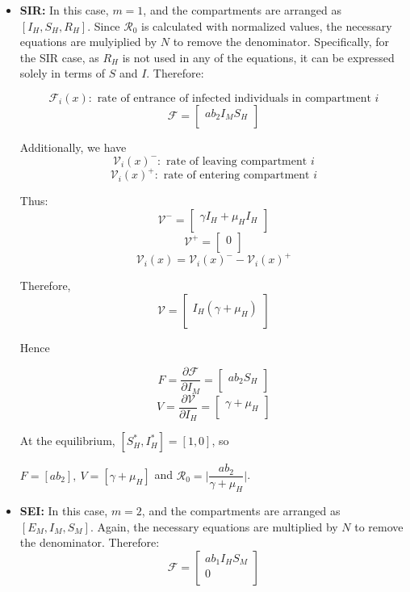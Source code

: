 \documentclass[a4paper,fleqn]{cas-dc}
\begin{document}
\begin{itemize}
\item \textbf{SIR:}
In this case, $m=1$, and the compartments are arranged as $[I_H, S_H, R_H]$. Since $\mathcal{R}_0$ is calculated with normalized values, the necessary equations are mulyiplied by $N$ to remove the denominator. Specifically, for the SIR case, as $R_H$ is not used in any of the equations, it can be expressed solely in terms of $S$ and $I$. Therefore:

$$ {\mathcal F}_i(x): \text{ rate of entrance of infected 
individuals in compartment } i $$
$$ {\mathcal F} =\begin{bmatrix}
a  b_2  I_M  S_H \\
\end{bmatrix} $$

Additionally, we have
$$ {\mathcal V}_i(x)^-: \text{ rate of leaving compartment } i $$
$$ {\mathcal V}_i(x)^+: \text{ rate of entering compartment } i $$

Thus:
$$
{\mathcal V^-} = \begin{bmatrix}
\gamma I_H + \mu_H I_H\\
\end{bmatrix}
$$
$$
{\mathcal V^+} = \begin{bmatrix}
0\\
\end{bmatrix}
$$
$${\mathcal V}_i (x) = {\mathcal V}_i(x)^{-} - {\mathcal V}_i(x)^+$$

Therefore,
$$
{\mathcal V} =
\begin{bmatrix}
I_H (\gamma + \mu_H) \\
\end{bmatrix}
$$

Hence

$$ F = \dfrac{\partial{\mathcal F}}{\partial I_M} =\begin{bmatrix}
a  b_2  S_H \\
\end{bmatrix} $$
$$ V = \dfrac{\partial{\mathcal V}}{\partial I_H} =\begin{bmatrix}
\gamma + \mu_H\\
\end{bmatrix} $$

At the equilibrium, $[S_H^*, I_H^*] = [1,0]$, so

$F=[a  b_2], \ V = [\gamma+\mu_H]$ and $\mathcal{R}_0 = \Big | \dfrac{ab_2}{\gamma+\mu_H}\Big | $.

\item \textbf{SEI:}
In this case, $m=2$, and the compartments are arranged as $[E_M, I_M, S_M]$. Again, the necessary equations are multiplied by $N$ to remove the denominator. Therefore:
$$ {\mathcal F} =\begin{bmatrix}
a b_1 I_H S_M\\
0\\
\end{bmatrix} $$


\end{itemize}
\end{document}

